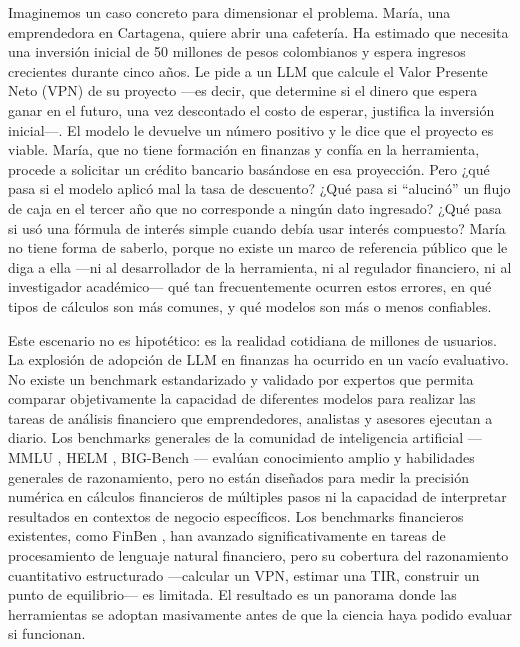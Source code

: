 \documentclass[12pt,a4paper]{article}
\begin{document}
Imaginemos un caso concreto para dimensionar el problema. María, una emprendedora en Cartagena, quiere abrir una cafetería. Ha estimado que necesita una inversión inicial de 50 millones de pesos colombianos y espera ingresos crecientes durante cinco años. Le pide a un LLM que calcule el Valor Presente Neto (VPN) de su proyecto ---es decir, que determine si el dinero que espera ganar en el futuro, una vez descontado el costo de esperar, justifica la inversión inicial---. El modelo le devuelve un número positivo y le dice que el proyecto es viable. María, que no tiene formación en finanzas y confía en la herramienta, procede a solicitar un crédito bancario basándose en esa proyección. Pero ¿qué pasa si el modelo aplicó mal la tasa de descuento? ¿Qué pasa si ``alucinó'' un flujo de caja en el tercer año que no corresponde a ningún dato ingresado? ¿Qué pasa si usó una fórmula de interés simple cuando debía usar interés compuesto? María no tiene forma de saberlo, porque no existe un marco de referencia público que le diga a ella ---ni al desarrollador de la herramienta, ni al regulador financiero, ni al investigador académico--- qué tan frecuentemente ocurren estos errores, en qué tipos de cálculos son más comunes, y qué modelos son más o menos confiables.

Este escenario no es hipotético: es la realidad cotidiana de millones de usuarios. La explosión de adopción de LLM en finanzas ha ocurrido en un vacío evaluativo. No existe un benchmark estandarizado y validado por expertos que permita comparar objetivamente la capacidad de diferentes modelos para realizar las tareas de análisis financiero que emprendedores, analistas y asesores ejecutan a diario. Los benchmarks generales de la comunidad de inteligencia artificial ---MMLU \citep{Hendrycks2021}, HELM \citep{Liang2023}, BIG-Bench \citep{Srivastava2022}--- evalúan conocimiento amplio y habilidades generales de razonamiento, pero no están diseñados para medir la precisión numérica en cálculos financieros de múltiples pasos ni la capacidad de interpretar resultados en contextos de negocio específicos. Los benchmarks financieros existentes, como FinBen \citep{Xie2024}, han avanzado significativamente en tareas de procesamiento de lenguaje natural financiero, pero su cobertura del razonamiento cuantitativo estructurado ---calcular un VPN, estimar una TIR, construir un punto de equilibrio--- es limitada. El resultado es un panorama donde las herramientas se adoptan masivamente antes de que la ciencia haya podido evaluar si funcionan.
\end{document}

